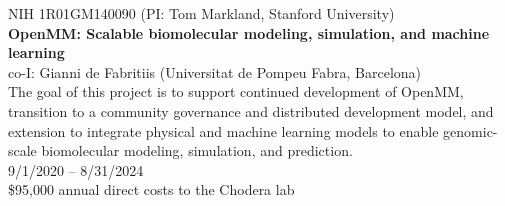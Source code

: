 \documentclass[10pt]{article}
\begin{document}
\vspace{1.5ex}

NIH 1R01GM140090 (PI: Tom Markland, Stanford University)\\
{\bf OpenMM: Scalable biomolecular modeling, simulation, and machine learning}\\
co-I: Gianni de Fabritiis (Universitat de Pompeu Fabra, Barcelona)\\
The goal of this project is to support continued development of OpenMM, transition to a community governance and distributed development model, and extension to integrate physical and machine learning models to enable genomic-scale biomolecular modeling, simulation, and prediction.\\
9/1/2020 -- 8/31/2024\\
\$95,000 annual direct costs to the Chodera lab


%

%

%
\end{document}
